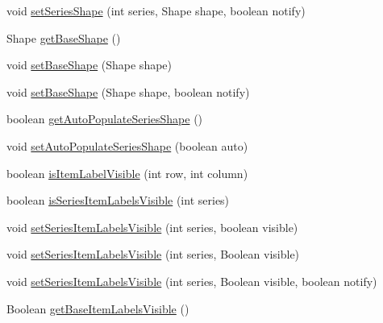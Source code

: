 \begin{DoxyCompactItemize}
void \mbox{\hyperlink{classorg_1_1jfree_1_1chart_1_1renderer_1_1_abstract_renderer_a1ece8e85210c3e1a1a0cacaadbc2ba2e}{set\+Series\+Shape}} (int series, Shape shape, boolean notify)
\item 
Shape \mbox{\hyperlink{classorg_1_1jfree_1_1chart_1_1renderer_1_1_abstract_renderer_a43dcca93629b149904310c59176c889a}{get\+Base\+Shape}} ()
\item 
void \mbox{\hyperlink{classorg_1_1jfree_1_1chart_1_1renderer_1_1_abstract_renderer_af60c105686a1d89902ed4897bdfe8e59}{set\+Base\+Shape}} (Shape shape)
\item 
void \mbox{\hyperlink{classorg_1_1jfree_1_1chart_1_1renderer_1_1_abstract_renderer_a20a150379e1a4ce65892c2a3929e18f1}{set\+Base\+Shape}} (Shape shape, boolean notify)
\item 
boolean \mbox{\hyperlink{classorg_1_1jfree_1_1chart_1_1renderer_1_1_abstract_renderer_ad675c5f6d25fc7e964ce4d64fdd3225d}{get\+Auto\+Populate\+Series\+Shape}} ()
\item 
void \mbox{\hyperlink{classorg_1_1jfree_1_1chart_1_1renderer_1_1_abstract_renderer_abb8c6c6a7bf35579a1bb6284d2a70c1c}{set\+Auto\+Populate\+Series\+Shape}} (boolean auto)
\item 
boolean \mbox{\hyperlink{classorg_1_1jfree_1_1chart_1_1renderer_1_1_abstract_renderer_aa704c4daa5df872b3c85878e69a0a426}{is\+Item\+Label\+Visible}} (int row, int column)
\item 
boolean \mbox{\hyperlink{classorg_1_1jfree_1_1chart_1_1renderer_1_1_abstract_renderer_a893ef1d89ebb97a85a44879826e7a02b}{is\+Series\+Item\+Labels\+Visible}} (int series)
\item 
void \mbox{\hyperlink{classorg_1_1jfree_1_1chart_1_1renderer_1_1_abstract_renderer_a6869c5846916c77906dca12886163878}{set\+Series\+Item\+Labels\+Visible}} (int series, boolean visible)
\item 
void \mbox{\hyperlink{classorg_1_1jfree_1_1chart_1_1renderer_1_1_abstract_renderer_a4eaa4bcb028eb2430a5103d928927101}{set\+Series\+Item\+Labels\+Visible}} (int series, Boolean visible)
\item 
void \mbox{\hyperlink{classorg_1_1jfree_1_1chart_1_1renderer_1_1_abstract_renderer_a2bf2c20394d6e1ab38eb3382e1442bdd}{set\+Series\+Item\+Labels\+Visible}} (int series, Boolean visible, boolean notify)
\item 
Boolean \mbox{\hyperlink{classorg_1_1jfree_1_1chart_1_1renderer_1_1_abstract_renderer_a360a67714905022c4373c33ad83626b8}{get\+Base\+Item\+Labels\+Visible}} ()
\item 

\end{DoxyCompactItemize}
